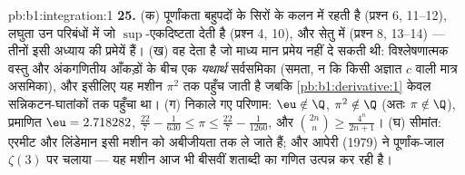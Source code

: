 \begin{solution}{pb:b1:integration:1}
\textbf{25.} (क) पूर्णांकता बहुपदों के सिरों के कलन में रहती है (प्रश्न 6,
11--12), लघुता उन परिबंधों में जो $\sup$-एकदिष्टता देती है (प्रश्न 4, 10),
और सेतु  में (प्रश्न 8, 13--14) --- तीनों इसी अध्याय की प्रमेयें
हैं। (ख)  वह देता है जो माध्य मान प्रमेय नहीं दे सकती थी: विश्लेषणात्मक
वस्तु और अंकगणितीय आँकड़ों के बीच एक \emph{यथार्थ} सर्वसमिका (समता, न कि
किसी अज्ञात $c$ वाली मात्र असमिका), और इसीलिए यह मशीन $\pi^2$ तक पहुँच जाती
है जबकि \cref{pb:b1:derivative:1} केवल सन्निकटन-घातांकों तक पहुँचा था। (ग)
निकाले गए परिणाम: $\eu \notin \Q$, $\pi^2 \notin \Q$ (अतः $\pi \notin \Q$),
प्रमाणित $\eu = 2.718282$, $\frac{22}{7} - \frac{1}{630} \leq \pi \leq
\frac{22}{7} - \frac{1}{1260}$, और $\binom{2n}{n} \geq \frac{4^n}{2n+1}$।
(घ) सीमांत: एरमीट और लिंडेमान इसी मशीन को अबीजीयता तक ले जाते हैं; और आपेरी
(1979) ने पूर्णांक-जाल $\zeta(3)$ पर चलाया --- यह मशीन आज भी बीसवीं शताब्दी
का गणित उत्पन्न कर रही है।
\end{solution}
